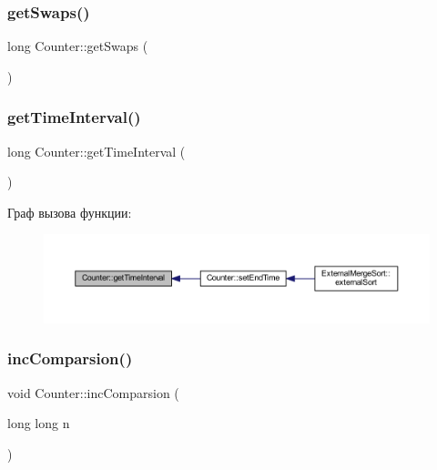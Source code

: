 \hypertarget{class_counter_af20f10e30e8bd1d078d1d66c518a814c}{}\label{class_counter_af20f10e30e8bd1d078d1d66c518a814c} 
\subsubsection{\texorpdfstring{get\+Swaps()}{getSwaps()}}
{\footnotesize\ttfamily long Counter\+::get\+Swaps (\begin{DoxyParamCaption}{ }\end{DoxyParamCaption})}

\hypertarget{class_counter_a25b1a1a6cd43fb23c2d1563d5b05aec6}{}\label{class_counter_a25b1a1a6cd43fb23c2d1563d5b05aec6} 
\subsubsection{\texorpdfstring{get\+Time\+Interval()}{getTimeInterval()}}
{\footnotesize\ttfamily long Counter\+::get\+Time\+Interval (\begin{DoxyParamCaption}{ }\end{DoxyParamCaption})}

Граф вызова функции\+:\nopagebreak
\begin{figure}[H]
\begin{center}
\leavevmode
\includegraphics[width=350pt]{class_counter_a25b1a1a6cd43fb23c2d1563d5b05aec6_icgraph}
\end{center}
\end{figure}
\hypertarget{class_counter_a224d93150c0fe2982d3efd7aa99668e6}{}\label{class_counter_a224d93150c0fe2982d3efd7aa99668e6} 
\subsubsection{\texorpdfstring{inc\+Comparsion()}{incComparsion()}}
{\footnotesize\ttfamily void Counter\+::inc\+Comparsion (\begin{DoxyParamCaption}\item[{long long}]{n }\end{DoxyParamCaption})}


